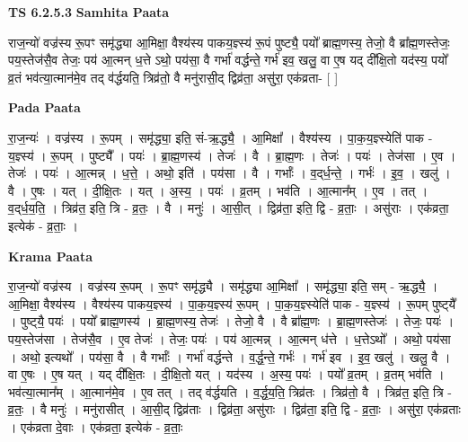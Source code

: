 \documentclass[17pt]{extarticle}
\begin{document}
\textbf{TS 6.2.5.3 } \newline
\textbf{Samhita Paata} \newline

राज॒न्यो॑ वज्र॑स्य रू॒पꣳ समृ॑द्ध्या आ॒मिक्षा॒ वैश्य॑स्य पाकय॒ज्ञ्स्य॑ रू॒पं पुष्ट्यै॒ पयो᳚ ब्राह्म॒णस्य॒ तेजो॒ वै ब्रा᳚ह्म॒णस्तेजः॒ पय॒स्तेज॑सै॒व तेजः॒ पय॑ आ॒त्मन् ध॒त्ते ऽथो॒ पय॑सा॒ वै गर्भा॑ वर्द्धन्ते॒ गर्भ॑ इव॒ खलु॒ वा ए॒ष यद् दी᳚क्षि॒तो यद॑स्य॒ पयो᳚ व्र॒तं भव॑त्या॒त्मान॑मे॒व तद् व॑र्द्धयति॒ त्रिव्र॑तो॒ वै मनु॑रासी॒द् द्विव्र॑ता॒ असु॑रा॒ एक॑व्रता- [  ] \newline

\textbf{Pada Paata} \newline

रा॒ज॒न्यः॑ । वज्र॑स्य । रू॒पम् । समृ॑द्ध्या॒ इति॒ सं-ऋ॒द्ध्यै॒ । आ॒मिक्षा᳚ । वैश्य॑स्य । पा॒क॒य॒ज्ञ्स्येति॑ पाक - य॒ज्ञ्स्य॑ । रू॒पम् । पुष्ट्यै᳚ । पयः॑ । ब्रा॒ह्म॒णस्य॑ । तेजः॑ । वै । ब्रा॒ह्म॒णः । तेजः॑ । पयः॑ । तेज॑सा । ए॒व । तेजः॑ । पयः॑ । आ॒त्मन्न् । ध॒त्ते॒ । अथो॒ इति॑ । पय॑सा । वै । गर्भाः᳚ । व॒द्‌र्ध॒न्ते॒ । गर्भः॑ । इ॒व॒ । खलु॑ । वै । ए॒षः । यत् । दी॒क्षि॒तः । यत् । अ॒स्य॒ । पयः॑ । व्र॒तम् । भव॑ति । आ॒त्मान᳚म् । ए॒व । तत् । व॒द्‌र्ध॒य॒ति॒ । त्रिव्र॑त॒ इति॒ त्रि - व्र॒तः॒ । वै । मनुः॑ । आ॒सी॒त् । द्विव्र॑ता॒ इति॒ द्वि - व्र॒ताः॒ । असु॑राः । एक॑व्रता॒ इत्येक॑ - व्र॒ताः॒ ।  \newline


\textbf{Krama Paata} \newline

रा॒ज॒न्यो॑ वज्र॑स्य । वज्र॑स्य रू॒पम् । रू॒पꣳ समृ॑द्ध्यै । समृ॑द्ध्या आ॒मिक्षा᳚ । समृ॑द्ध्या॒ इति॒ सम् - ऋ॒द्ध्यै॒ । आ॒मिक्षा॒ वैश्य॑स्य । वैश्य॑स्य पाकय॒ज्ञ्स्य॑ । पा॒क॒य॒ज्ञ्स्य॑ रू॒पम् । पा॒क॒य॒ज्ञ्स्येति॑ पाक - य॒ज्ञ्स्य॑ । रू॒पम् पुष्ट्‍यै᳚ । पुष्ट्‍यै॒ पयः॑ । पयो᳚ ब्राह्म॒णस्य॑ । ब्रा॒ह्म॒णस्य॒ तेजः॑ । तेजो॒ वै । वै ब्रा᳚ह्म॒णः । ब्रा॒ह्म॒णस्तेजः॑ । तेजः॒ पयः॑ । पय॒स्तेज॑सा । तेज॑सै॒व । ए॒व तेजः॑ । तेजः॒ पयः॑ । पय॑ आ॒त्मन्न् । आ॒त्मन् ध॑त्ते । ध॒त्तेऽथो᳚ । अथो॒ पय॑सा । अथो॒ इत्यथो᳚ । पय॑सा॒ वै । वै गर्भाः᳚ । गर्भा॑ वर्द्धन्ते । व॒र्द्ध॒न्ते॒ गर्भः॑ । गर्भ॑ इव । इ॒व॒ खलु॑ । खलु॒ वै । वा ए॒षः । ए॒ष यत् । यद् दी᳚क्षि॒तः । दी॒क्षि॒तो यत् । यद॑स्य । अ॒स्य॒ पयः॑ । पयो᳚ व्र॒तम् । व्र॒तम् भव॑ति । भव॑त्या॒त्मान᳚म् । आ॒त्मान॑मे॒व । ए॒व तत् । तद् व॑र्द्धयति । व॒र्द्ध॒य॒ति॒ त्रिव्र॑तः । त्रिव्र॑तो॒ वै । त्रिव्र॑त॒ इति॒ त्रि - व्र॒तः॒ । वै मनुः॑ । मनु॑रासीत् । आ॒सी॒द् द्विव्र॑ताः । द्विव्र॑ता॒ असु॑राः । द्विव्र॑ता॒ इति॒ द्वि - व्र॒ताः॒ । असु॑रा॒ एक॑व्रताः । एक॑व्रता दे॒वाः । एक॑व्रता॒ इत्येक॑ - व्र॒ताः॒ \newline
\end{document}
